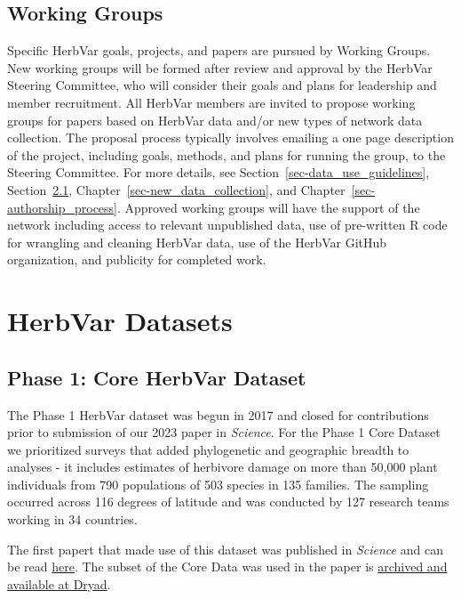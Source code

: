 \documentclass[
  letterpaper,
  oneside,
  open=any]{scrbook}
\begin{document}
\section{Working Groups}\label{working-groups}

Specific HerbVar goals, projects, and papers are pursued by Working
Groups. New working groups will be formed after review and approval by
the HerbVar Steering Committee, who will consider their goals and plans
for leadership and member recruitment. All HerbVar members are invited
to propose working groups for papers based on HerbVar data and/or new
types of network data collection. The proposal process typically
involves emailing a one page description of the project, including
goals, methods, and plans for running the group, to the Steering
Committee. For more details, see Section~\ref{sec-data_use_guidelines},
Section~\ref{sec-datasets}, Chapter~\ref{sec-new_data_collection}, and
Chapter~\ref{sec-authorship_process}. Approved working groups will have
the support of the network including access to relevant unpublished
data, use of pre-written R code for wrangling and cleaning HerbVar data,
use of the HerbVar GitHub organization, and publicity for completed
work.

\chapter{HerbVar Datasets}\label{herbvar-datasets}

\section{Phase 1: Core HerbVar Dataset}\label{sec-datasets}

The Phase 1 HerbVar dataset was begun in 2017 and closed for
contributions prior to submission of our 2023 paper in \emph{Science}.
For the Phase 1 Core Dataset we prioritized surveys that added
phylogenetic and geographic breadth to analyses - it includes estimates
of herbivore damage on more than 50,000 plant individuals from 790
populations of 503 species in 135 families. The sampling occurred across
116 degrees of latitude and was conducted by 127 research teams working
in 34 countries.

The first papert that made use of this dataset was published in
\emph{Science} and can be read
\href{https://www.science.org/doi/10.1126/science.adh8830}{here}. The
subset of the Core Data was used in the paper is
\href{https://datadryad.org/stash/dataset/doi:10.5061/dryad.44j0zpckm}{archived
and available at Dryad}.
\end{document}

